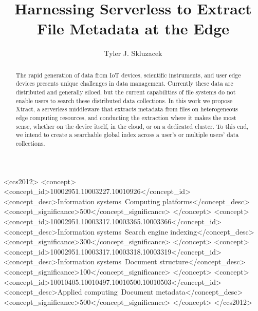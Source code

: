 \documentclass[sigconf, 9pt]{acmart}
\newcommand{\tyler}[1]{}
\newcommand{\kyle}[1]{}
\newcommand{\tyler}[1]{{\textcolor{cyan}{ tyler: #1 }}}
\newcommand{\kyle}[1]{{\textcolor{purple}{ Kyle: #1 }}}
\newcommand{\name}{Xtract}
\begin{document}
\title{Harnessing Serverless to Extract File Metadata at the Edge}


\author{Tyler J. Skluzacek} 



\renewcommand{\shortauthors}{Skluzacek et al.}

\begin{abstract}
\tyler{max 100 words}




The rapid generation of data from IoT devices, scientific instruments, and user edge devices presents
unique challenges in data management. Currently these data are distributed and generally siloed, 
but the current capabilities of file systems do not enable users to search these distributed data collections.
 In this work we propose \name{}, a serverless middleware 
that extracts metadata from files on heterogeneous edge computing resources, and conducting the extraction 
where it makes the most sense, whether on the device itself, in the cloud, or on a dedicated cluster. 
To this end, we intend to create a searchable global index across a user's or multiple users' data collections.  
	
	


\end{abstract}

\begin{CCSXML}
<ccs2012>
<concept>
<concept_id>10002951.10003227.10010926</concept_id>
<concept_desc>Information systems~Computing platforms</concept_desc>
<concept_significance>500</concept_significance>
</concept>
<concept>
<concept_id>10002951.10003317.10003365.10003366</concept_id>
<concept_desc>Information systems~Search engine indexing</concept_desc>
<concept_significance>300</concept_significance>
</concept>
<concept>
<concept_id>10002951.10003317.10003318.10003319</concept_id>
<concept_desc>Information systems~Document structure</concept_desc>
<concept_significance>100</concept_significance>
</concept>
<concept>
<concept_id>10010405.10010497.10010500.10010503</concept_id>
<concept_desc>Applied computing~Document metadata</concept_desc>
<concept_significance>500</concept_significance>
</concept>
</ccs2012>
\end{CCSXML}
\end{document}
